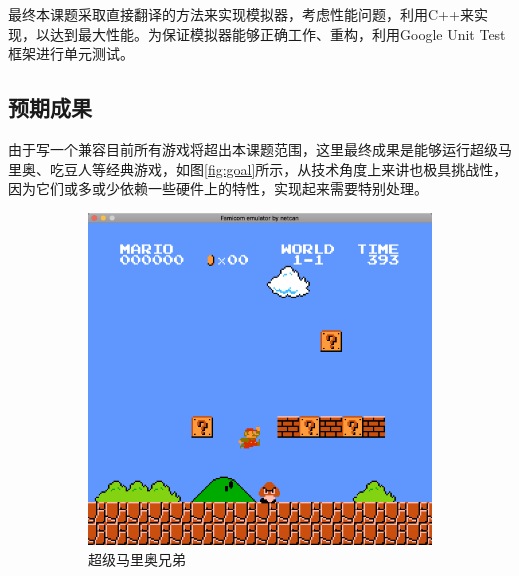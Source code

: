 \documentclass[a4paper]{ltxdoc}
\begin{document}
{最终本课题采取直接翻译的方法来实现模拟器，考虑性能问题，利用C++来实现，以达到最大性能。为保证模拟器能够正确工作、重构，利用Google Unit Test框架进行单元测试。

\subsection{预期成果}
由于写一个兼容目前所有游戏将超出本课题范围，这里最终成果是能够运行超级马里奥、吃豆人等经典游戏，如图\ref{fig:goal}所示，从技术角度上来讲也极具挑战性，因为它们或多或少依赖一些硬件上的特性，实现起来需要特别处理。
\begin{figure}[h]
	\centering
		\begin{subfigure}[b]{0.45\textwidth}
			\includegraphics[width=\textwidth]{images/super_mario_bros.png}
			\caption{超级马里奥兄弟}
		\end{subfigure}
		\begin{subfigure}[b]{0.45\textwidth}

\end{subfigure}
\end{figure}}
\end{document}
